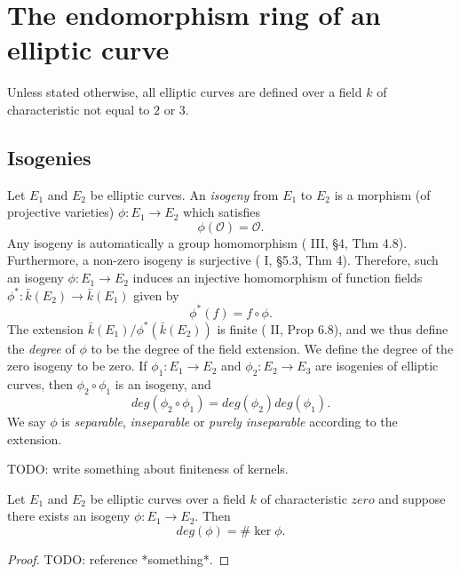 \newpage
\section{The endomorphism ring of an elliptic curve}
\label{sec:endomorphism-ring-of-an-elliptic-curve}

Unless stated otherwise, all elliptic curves are defined over a field $k$ of
characteristic not equal to $2$ or $3$.

\subsection{Isogenies}
\label{sec:isogenies}

Let $E_{1}$ and $E_{2}$ be elliptic curves.  An \emph{isogeny} from $E_{1}$ to
$E_{2}$ is a morphism (of projective varieties) $\phi \colon E_{1} \rightarrow E_{2}$
which satisfies
\begin{equation*}
  \phi \left( \mathcal{O} \right) = \mathcal{O}.
\end{equation*}
Any isogeny is automatically a group homomorphism (\cite{silverman86} III, \S 4, Thm
4.8).  Furthermore, a non-zero isogeny is surjective (\cite{shafarevich94} I, \S 5.3,
Thm 4).  Therefore, such an isogeny $\phi \colon E_{1} \rightarrow E_{2}$ induces an
injective homomorphism of function fields $\phi^{*} \colon \bar{k}\left(E_{2}\right)
\rightarrow \bar{k}\left(E_{1}\right)$ given by
\begin{equation*}
  \phi^{*}\left(f\right) = f \circ \phi.
\end{equation*}
The extension $\bar{k}\left(E_{1}\right) /
\phi^{*}\left(\bar{k}\left(E_{2}\right)\right)$ is finite (\cite{hartshorne77} II,
Prop 6.8), and we thus define the \emph{degree} of $\phi$ to be the degree of the
field extension.  We define the degree of the zero isogeny to be zero.  If $\phi_{1}
\colon E_{1} \rightarrow E_{2}$ and $\phi_{2} \colon E_{2} \rightarrow E_{3}$ are
isogenies of elliptic curves, then $\phi_{2} \circ \phi_{1}$ is an isogeny, and
\begin{equation}
  \label{eq:degree-of-composition}
  deg \left( \phi_{2} \circ \phi_{1} \right) = deg \left( \phi_{2} \right) deg \left( \phi_{1} \right).
\end{equation}
We say $\phi$ is \emph{separable}, \emph{inseparable} or \emph{purely inseparable}
according to the extension.

TODO: write something about finiteness of kernels.

\begin{prop}
  \label{prop:deg-phi-equals-sizeof-kernel}
  Let $E_{1}$ and $E_{2}$ be elliptic curves over a field $k$ of characteristic
  $zero$ and suppose there exists an isogeny $\phi : E_{1} \rightarrow E_{2}$.  Then
  \begin{equation*}
    deg(\phi) = \# \ker{\phi}.
  \end{equation*}
\end{prop}
\begin{proof}
  TODO: reference *something*.
\end{proof}


